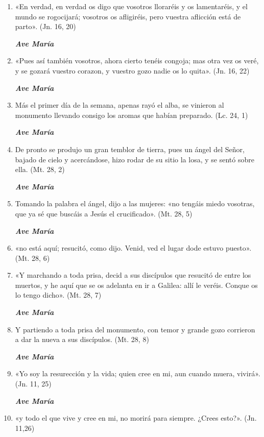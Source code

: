 \documentclass[a4paper,11pt, oneside]{report}
\begin{document}
      \begin{enumerate}
        
        \item «En verdad, en verdad os digo que vosotros lloraréis y os lamentaréis, y el mundo se rogocijará;
        vosotros os afligiréis, pero vuestra aflicción está de parto». (Jn. 16, 20)

        \textbf{\textit{Ave María}}

        \item «Pues así también vosotros, ahora cierto tenéis congoja; mas otra vez os veré, y se gozará vuestro corazon,
        y vuestro gozo nadie os lo quita». (Jn. 16, 22)

        \textbf{\textit{Ave María}}

        \item Más el primer día de la semana, apenas rayó el alba, se vinieron al monumento llevando consigo los aromas
        que habían preparado. (Lc. 24, 1)

        \textbf{\textit{Ave María}}

        \item De pronto se produjo un gran temblor de tierra, pues un ángel del Señor, bajado de cielo y acercándose, hizo rodar
        de su sitio la losa, y se sentó sobre ella. (Mt. 28, 2)
        
        \textbf{\textit{Ave María}}

        \item Tomando la palabra el ángel, dijo a las mujeres: «no tengáis miedo vosotras, que ya sé que buscáis a Jesús el crucificado». (Mt. 28, 5)

        \textbf{\textit{Ave María}}

        \item «no está aquí; resucitó, como dijo. Venid, ved el lugar dode estuvo puesto». (Mt. 28, 6)

        \item «Y marchando a toda prisa, decid a sus discípulos que resucitó de entre los muertos, y he aquí que se os adelanta en ir a Galilea:
        allí le veréis. Conque os lo tengo dicho». (Mt. 28, 7)

        \textbf{\textit{Ave María}}

        \item Y partiendo a toda prisa del monumento, con temor y grande gozo corrieron a dar la nueva a sus discípulos. (Mt. 28, 8)

        \textbf{\textit{Ave María}}

        \item «Yo soy la resurección y la vida; quien cree en mi, aun cuando muera, vivirá». (Jn. 11, 25)

        \textbf{\textit{Ave María}}

        \item «y todo el que vive y cree en mi, no morirá para siempre. ¿Crees esto?». (Jn. 11,26)
        
      \end{enumerate}
\end{document}
